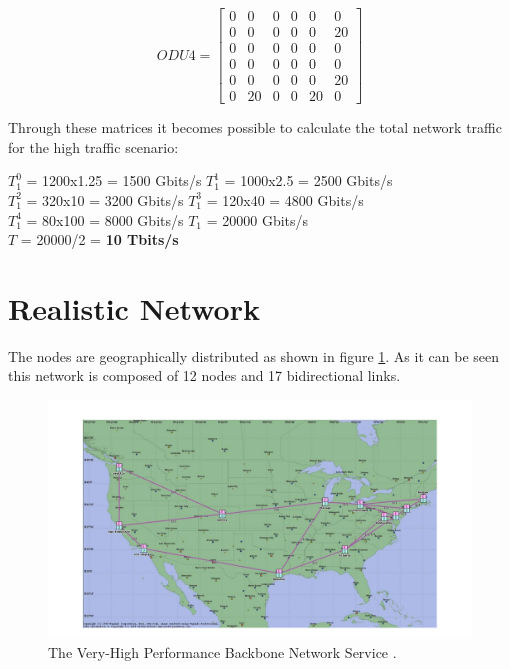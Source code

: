 \[
ODU4=
  \begin{bmatrix}
    0 & 0 & 0 & 0 & 0 & 0 \\
    0 & 0 & 0 & 0 & 0 & 20 \\
    0 & 0 & 0 & 0 & 0 & 0 \\
    0 & 0 & 0 & 0 & 0 & 0 \\
    0 & 0 & 0 & 0 & 0 & 20 \\
    0 & 20 & 0 & 0 & 20 & 0
  \end{bmatrix}
\]

\vspace{17pt}
Through these matrices it becomes possible to calculate the total network traffic for the high traffic scenario:

$T_1^0$ = 1200x1.25 = 1500 Gbits/s \qquad
$T_1^1$ = 1000x2.5 = 2500 Gbits/s \\

$T_1^2$ = 320x10 = 3200 Gbits/s \qquad
$T_1^3$ = 120x40 = 4800 Gbits/s \\

$T_1^4$ = 80x100 = 8000 Gbits/s \qquad
$T_{1}$ = 20000 Gbits/s \\

$T$ = 20000/2 = \textbf{10 Tbits/s}



\section{Realistic Network}
\label{realisticNetwork}

The nodes are geographically distributed as shown in figure \ref{vbns}. As it can be seen this network is composed of 12 nodes and 17 bidirectional links.
\begin{figure}[H]
  \label{cisco}
  \begin{center}
    \includegraphics[width=1\textwidth]{fig/logos/realisticNetwork.pdf}
    \caption{The Very-High Performance Backbone Network Service \cite{redeRealista}.}
  \end{center}
  \label{vbns}
\end{figure}

